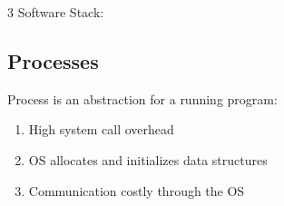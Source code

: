 \documentclass[12pt, a4paper]{article}
\begin{document}
\begin{multicols*}{3}
Software Stack:
\begin{center}
\end{center}

\colbreak
\subsection{Processes}
Process is an abstraction for a running program:
\begin{enumerate}[$-$]\vspace{-2pt}
  \item High system call overhead 
  \item OS allocates and initializes data structures 
  \item Communication costly through the OS
\end{enumerate}\vspace{-1pt}
{\centering
\par}

\end{multicols*}
\end{document}
